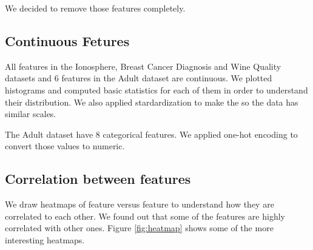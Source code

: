 \documentclass[conference]{IEEEtran}
\begin{document}
We decided to remove those features completely.

\subsection{Continuous Fetures}

All features in the Ionosphere, Breast Cancer Diagnosis and Wine Quality datasets and 6 features in the Adult dataset are continuous. We plotted histograms and computed basic statistics for each of them in order to understand their distribution. We also applied stardardization to make the so the data has similar scales.


The Adult dataset have 8 categorical features. We applied one-hot encoding to convert those values to numeric.

\subsection{Correlation between features}

We draw heatmaps of feature versus feature to understand how they are correlated to each other. We found out that some of the features are highly correlated with other ones. Figure \ref{fig:heatmap} shows some of the more interesting heatmaps.
\end{document}
